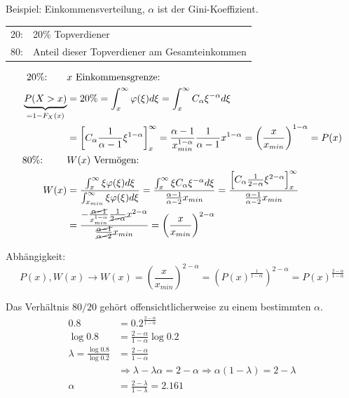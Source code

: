\documentclass[10pt,a4paper]{scrartcl}
\begin{document}
Beispiel: Einkommensverteilung, $\alpha$ ist der Gini-Koeffizient.

\begin{center}
\begin{tabular}{rl}
    20: \qquad & 20\% Topverdiener \\
    80: \qquad & Anteil dieser Topverdiener am Gesamteinkommen \\
\end{tabular}
\end{center}

\begin{align*}
    \text{20\%:} \qquad &x \text{ Einkommensgrenze: } \\
    \underbrace{P(X>x)}_{=1-F_X(x)} &= 20\% = \int_x^\infty \varphi(\xi)d\xi
        = \int_x^\infty C_\alpha \xi^{-\alpha}d\xi \\
    &= \left[ C_\alpha \frac{1}{\alpha-1} \xi^{1-\alpha} \right]_x^\infty = \frac{\alpha-1}{x_{min}^{1-\alpha}} \frac{1}{\alpha-1}x^{1-\alpha} 
        = \left(\frac{x}{x_{min}}\right)^{1-\alpha} = P(x) \\
    \text{80\%: } \qquad &W(x) \text{ Vermögen:} \\
    W(x) &= \frac{\int_x^\infty \xi\varphi(\xi)d\xi}{\int_{x_{min}}^\infty \xi\varphi(\xi)d\xi} =
        \frac{\int_x^\infty \xi C_\alpha\xi^{-\alpha}d\xi}{\frac{\alpha-1}{\alpha-2} x_{min}} = 
        \frac{\left[C_\alpha \frac{1}{2-\alpha} \xi^{2-\alpha}\right]_x^\infty}{\frac{\alpha-1}{\alpha-2} x_{min}} \\
        & = \frac{-\frac{\cancel{\alpha-1}}{x_{min}^{1-\alpha}} \frac{1}{\cancel{2-\alpha}} x^{2-\alpha} }{\frac{\cancel{\alpha-1}}{\cancel{\alpha-2}} x_{min}} 
        = \left(\frac{x}{x_{min}}\right)^{2-\alpha}
\end{align*}

Abhängigkeit: $$P(x), W(x) \longrightarrow W(x) = \left(\frac{x}{x_{min}}\right)^{2-\alpha} 
    = \left(P(x)^{\frac{1}{1-\alpha}}\right)^{2-\alpha} = P(x)^{\frac{2-\alpha}{1-\alpha}} $$

Das Verhältnis $80/20$ gehört offensichtlicherweise zu einem bestimmten $\alpha$. 
\begin{align*}
    0.8 &= 0.2^{\frac{2-\alpha}{1-\alpha}} \\
    \log 0.8 &= \frac{2-\alpha}{1-\alpha} \log 0.2 \\
    \lambda = \frac{\log 0.8}{\log 0.2} &= \frac{2-\alpha}{1-\alpha} \\
    &\Rightarrow \lambda - \lambda\alpha = 2-\alpha \Rightarrow \alpha(1-\lambda) = 2-\lambda \\
    \alpha &= \frac{2-\lambda}{1-\lambda} = 2.161
\end{align*}
\end{document}
